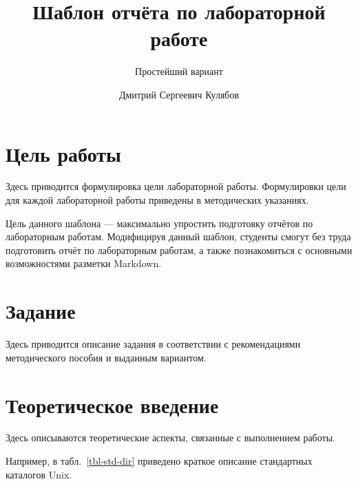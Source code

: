 \documentclass[
  12pt,
  a4paper,
  DIV=11,
  numbers=noendperiod]{scrreprt}
\title{Шаблон отчёта по лабораторной работе}
\subtitle{Простейший вариант}
\author{Дмитрий Сергеевич Кулябов}
\date{}
\renewcommand*\contentsname{Содержание}
\newcommand\contentsname{Содержание}
\begin{document}
\maketitle

\renewcommand*\contentsname{Содержание}
{
\setcounter{tocdepth}{1}
\tableofcontents
}
\listoffigures
\listoftables
{}
\chapter{Цель
работы}\label{ux446ux435ux43bux44c-ux440ux430ux431ux43eux442ux44b}

Здесь приводится формулировка цели лабораторной работы. Формулировки
цели для каждой лабораторной работы приведены в методических указаниях.

Цель данного шаблона --- максимально упростить подготовку отчётов по
лабораторным работам. Модифицируя данный шаблон, студенты смогут без
труда подготовить отчёт по лабораторным работам, а также познакомиться с
основными возможностями разметки Markdown.

\chapter{Задание}\label{ux437ux430ux434ux430ux43dux438ux435}

Здесь приводится описание задания в соответствии с рекомендациями
методического пособия и выданным вариантом.

\chapter{Теоретическое
введение}\label{ux442ux435ux43eux440ux435ux442ux438ux447ux435ux441ux43aux43eux435-ux432ux432ux435ux434ux435ux43dux438ux435}

Здесь описываются теоретические аспекты, связанные с выполнением работы.

Например, в табл.~\ref{tbl-std-dir} приведено краткое описание
стандартных каталогов Unix.
\end{document}
